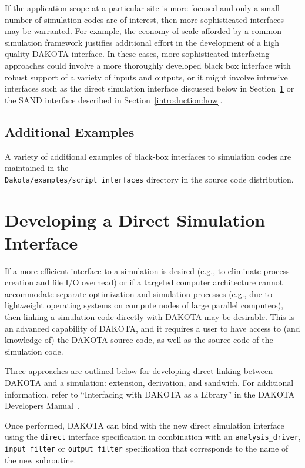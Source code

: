 If the application scope at a particular site is more focused and only
a small number of simulation codes are of interest, then more
sophisticated interfaces may be warranted. For example, the economy of
scale afforded by a common simulation framework justifies additional
effort in the development of a high quality DAKOTA interface. In these
cases, more sophisticated interfacing approaches could involve a more
thoroughly developed black box interface with robust support of a
variety of inputs and outputs, or it might involve intrusive
interfaces such as the direct simulation interface discussed below in
Section~\ref{advint:direct} or the SAND interface described in
Section~\ref{introduction:how}.

\subsection{Additional Examples}

A variety of additional examples of black-box interfaces to simulation
codes are maintained in the\\
\texttt{Dakota/examples/script\_interfaces} directory in the source
code distribution.


\section{Developing a Direct Simulation Interface}\label{advint:direct}

If a more efficient interface to a simulation is desired (e.g., to
eliminate process creation and file I/O overhead) or if a targeted
computer architecture cannot accommodate separate optimization and
simulation processes (e.g., due to lightweight operating systems on
compute nodes of large parallel computers), then linking a simulation
code directly with DAKOTA may be desirable. This is an advanced
capability of DAKOTA, and it requires a user to have access to (and
knowledge of) the DAKOTA source code, as well as the source code of
the simulation code.

Three approaches are outlined below for developing direct linking
between DAKOTA and a simulation: extension, derivation, and
sandwich. For additional information, refer to ``Interfacing with
DAKOTA as a Library'' in the DAKOTA Developers Manual~\cite{DevMan}.

Once performed, DAKOTA can bind with the new direct simulation
interface using the \texttt{direct} interface specification in
combination with an \texttt{analysis\_driver}, \texttt{input\_filter}
or \texttt{output\_filter} specification that corresponds to the name
of the new subroutine.

